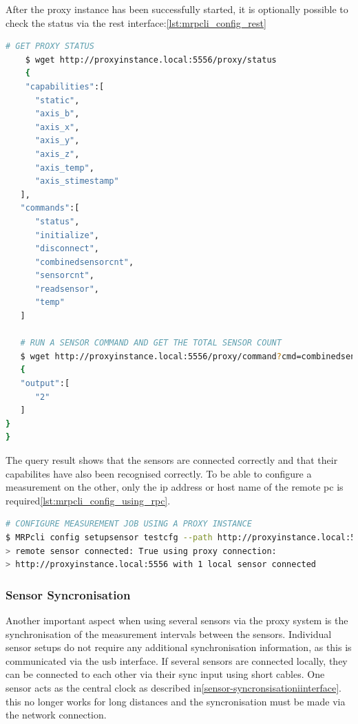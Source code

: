 After the proxy instance has been successfully started, it is optionally
possible to check the status via the \gls{rest}
interface:\ref{lst:mrpcli_config_rest}

\begin{lstlisting}[language=bash, caption={MRPproxy REST enpoiint query examples}, label=lst:mrpcli_config_rest]
    # GET PROXY STATUS
    $ wget http://proxyinstance.local:5556/proxy/status
    {
    "capabilities":[
      "static",
      "axis_b",
      "axis_x",
      "axis_y",
      "axis_z",
      "axis_temp",
      "axis_stimestamp"
   ],
   "commands":[
      "status",
      "initialize",
      "disconnect",
      "combinedsensorcnt",
      "sensorcnt",
      "readsensor",
      "temp"
   ]

   # RUN A SENSOR COMMAND AND GET THE TOTAL SENSOR COUNT
   $ wget http://proxyinstance.local:5556/proxy/command?cmd=combinedsensorcnt
   {
   "output":[
      "2"
   ]
}
}
\end{lstlisting}

The query result shows that the sensors are connected correctly and that
their capabilites have also been recognised correctly. To be able to
configure a measurement on the other, only the \gls{ip} address or host
name of the remote \gls{pc} is
required\ref{lst:mrpcli_config_using_rpc}.

\begin{lstlisting}[language=bash, caption={MRPcli usage example to connect with a network sensor}, label=lst:mrpcli_config_using_rpc]
# CONFIGURE MEASUREMENT JOB USING A PROXY INSTANCE
$ MRPcli config setupsensor testcfg --path http://proxyinstance.local:5556
> remote sensor connected: True using proxy connection:
> http://proxyinstance.local:5556 with 1 local sensor connected
\end{lstlisting}

\hypertarget{sensor-syncronisation}{%
\subsubsection{Sensor Syncronisation}\label{sensor-syncronisation}}

Another important aspect when using several sensors via the proxy system
is the synchronisation of the measurement intervals between the sensors.
Individual sensor setups do not require any additional synchronisation
information, as this is communicated via the \gls{usb} interface. If
several sensors are connected locally, they can be connected to each
other via their sync input using short cables. One sensor acts as the
central clock as described in\ref{sensor-syncronsisationiinterface}.
this no longer works for long distances and the syncronisation must be
made via the network connection.

